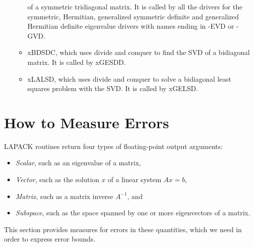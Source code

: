 \begin{itemize}
\begin{itemize}
         of a symmetric tridiagonal matrix. It is called by all the drivers for
         the symmetric, Hermitian, generalized symmetric definite and
         generalized Hermitian definite eigenvalue drivers with names ending in -EVD
         or -GVD.
   \item xBDSDC, which uses divide and conquer to find the SVD
         of a bidiagonal matrix. It is called by xGESDD.
   \item xLALSD, which uses divide and conquer to solve a bidiagonal least squares
         problem with the SVD. It is called by xGELSD.
   \end{itemize}
\end{itemize}

\section{How to Measure Errors}\label{secnormnotation}

LAPACK routines return four types of floating-point output arguments:
\begin{itemize}
\item {\em Scalar}, such as an eigenvalue of a matrix,
\item {\em Vector}, such as the solution $x$ of a linear system $Ax=b$,
\item {\em Matrix}, such as a matrix inverse $A^{-1}$, and
\item {\em Subspace}, such as the space spanned by one or more eigenvectors of a matrix.
\end{itemize}
This section provides measures for errors in these quantities, which we
need in order to express error bounds.


